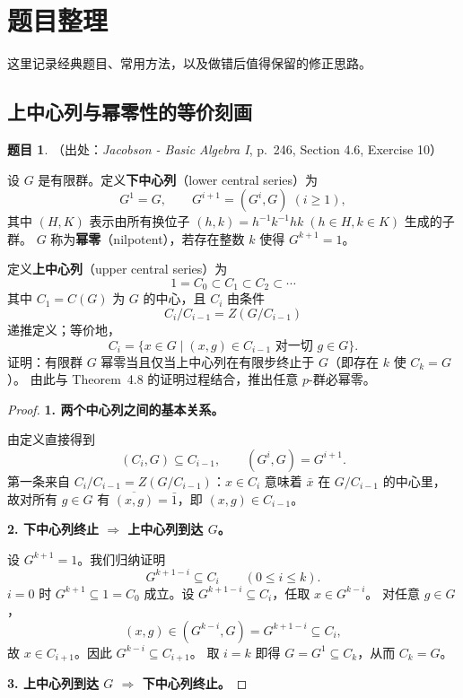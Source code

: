 \documentclass[a4paper]{ctexart}
\theoremstyle{definition}
\newtheorem{example}{题目}[section]
\theoremstyle{analysis}
\theoremstyle{plain}
\begin{document}
\newpage
\section{题目整理}

这里记录经典题目、常用方法，以及做错后值得保留的修正思路。

\subsection{\texorpdfstring{上中心列与幂零性的等价刻画}{上中心列与幂零性的等价刻画}}\label{subsec:problem-upper-central-nilpotent}

\begin{example}
（出处：\textit{Jacobson - Basic Algebra I}, p.~246, Section 4.6, Exercise 10）

设 \(G\) 是有限群。定义\textbf{下中心列}（lower central series）为
\[
  G^1=G,\qquad G^{i+1}=(G^i,G)\;(i\ge 1),
\]
其中 \((H,K)\) 表示由所有换位子 \((h,k)=h^{-1}k^{-1}hk\;(h\in H,k\in K)\) 生成的子群。
\(G\) 称为\textbf{幂零}（nilpotent），若存在整数 \(k\) 使得 \(G^{k+1}=1\)。

定义\textbf{上中心列}（upper central series）为
\[
  1=C_0\subset C_1\subset C_2\subset\cdots
\]
其中 \(C_1=C(G)\) 为 \(G\) 的中心，且 \(C_{i}\) 由条件
\[
  C_{i}/C_{i-1}=Z(G/C_{i-1})
\]
递推定义；等价地，
\[
  C_i=\{x\in G\mid (x,g)\in C_{i-1}\text{ 对一切 }g\in G\}.
\]
证明：有限群 \(G\) 幂零当且仅当上中心列在有限步终止于 \(G\)（即存在 \(k\) 使 \(C_k=G\)）。
由此与 Theorem~4.8 的证明过程结合，推出任意 \(p\)-群必幂零。

\begin{proof}
\textbf{1. 两个中心列之间的基本关系。}

由定义直接得到
\[
  (C_i,G)\subseteq C_{i-1},\qquad
  (G^i,G)=G^{i+1}.
\]
第一条来自 \(C_i/C_{i-1}=Z(G/C_{i-1})\)：\(x\in C_i\) 意味着 \(\bar x\) 在 \(G/C_{i-1}\) 的中心里，
故对所有 \(g\in G\) 有 \(\overline{(x,g)}=\bar 1\)，即 \((x,g)\in C_{i-1}\)。

\textbf{2. 下中心列终止 \(\Longrightarrow\) 上中心列到达 \(G\)。}

设 \(G^{k+1}=1\)。我们归纳证明
\[
  G^{k+1-i}\subseteq C_i\qquad (0\le i\le k).
\]
\(i=0\) 时 \(G^{k+1}\subseteq 1=C_0\) 成立。设 \(G^{k+1-i}\subseteq C_i\)，任取 \(x\in G^{k-i}\)。
对任意 \(g\in G\)，
\[
  (x,g)\in(G^{k-i},G)=G^{k+1-i}\subseteq C_i,
\]
故 \(x\in C_{i+1}\)。因此 \(G^{k-i}\subseteq C_{i+1}\)。
取 \(i=k\) 即得 \(G=G^1\subseteq C_k\)，从而 \(C_k=G\)。

\textbf{3. 上中心列到达 \(G\) \(\Longrightarrow\) 下中心列终止。}


\end{proof}
\end{example}
\end{document}
